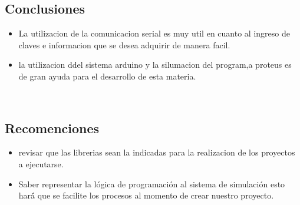 \documentclass[10pt,a4paper]{article}
\begin{document}
\subsection{Conclusiones}
\begin{itemize}
\item La utilizacion de la comunicacion serial es muy util en cuanto al ingreso de claves e informacion que se desea adquirir de manera facil.
\item la utilizacion ddel sistema arduino y la silumacion del program,a proteus es de gran ayuda para el desarrollo de esta materia.
\end{itemize}
\\
\subsection{Recomenciones}
\begin{itemize}
\item revisar que las librerias sean la indicadas para la realizacion de los proyectos a ejecutarse.
\item Saber representar la lógica de programación al sistema de simulación esto hará́ que se facilite los procesos al momento de crear nuestro proyecto.
\end{itemize}
\end{document}
